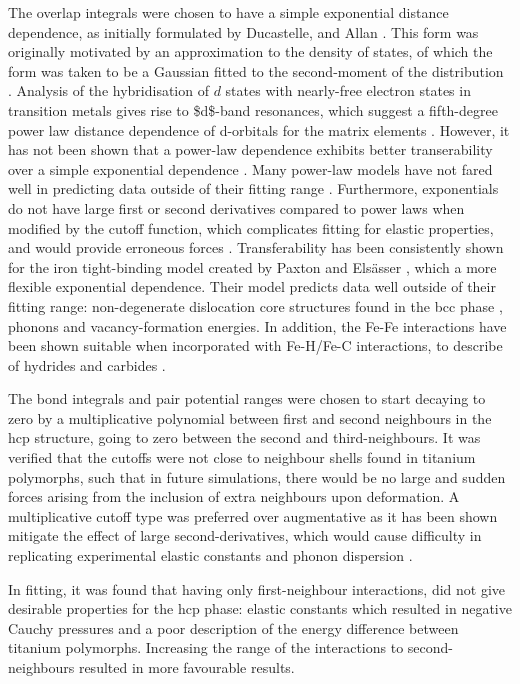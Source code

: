 \documentclass[a4paper,11pt]{article}
\numberwithin{equation}{chapter}
\numberwithin{listing}{chapter}
\begin{document}
The overlap integrals were chosen to have a simple exponential
distance dependence, as initially formulated by Ducastelle,
\cite{Ducastelle1970c} and Allan \cite{Allan1976}. This form was
originally motivated by an approximation to the density of states,
of which the form was taken to be a Gaussian fitted to the
second-moment of the distribution \cite{Spanjaard1984}. Analysis of
the hybridisation of \(d\) states with nearly-free electron states in
transition metals gives rise to \$d\$-band resonances, which suggest a
fifth-degree power law distance dependence of d-orbitals for the
matrix elements
\cite{Heine1967,Heine1980,Andersen1985,Harrison1989,Pettifor1995}. However, it has
not been shown that a power-law dependence exhibits better
transerability over a simple exponential dependence
\cite{Skinner1991,Paxton2010}. Many power-law models have not
fared well in predicting data outside of their fitting range
\cite{Paxton1987,Paxton1989,Girshick1998a,Trinkle2006,Ferrari2019a}. Furthermore,
exponentials do not have large first or second derivatives compared
to power laws when modified by the cutoff function, which
complicates fitting for elastic properties, and would provide
erroneous forces
\cite{Pashov2012}. Transferability has been consistently
shown for the iron tight-binding model created by Paxton and
Elsässer \cite{Paxton2010}, which a more flexible exponential
dependence. Their model predicts data well outside of their fitting
range: non-degenerate dislocation core structures found in the bcc
phase \cite{Simpsonb,Simpson2020}, phonons and vacancy-formation
energies. In addition, the Fe-Fe interactions have been shown
suitable when incorporated with Fe-H/Fe-C interactions, to describe
of hydrides and carbides \cite{Paxton2010,Paxton2013}.


The bond integrals and pair potential ranges were chosen to start
decaying to zero by a multiplicative polynomial between first and
second neighbours in the hcp structure, going to zero between the
second and third-neighbours. It was verified that the cutoffs were
not close to neighbour shells found in titanium
polymorphs, such that in future simulations, there would be no large
and sudden forces arising from the inclusion of extra neighbours
upon deformation. A multiplicative cutoff type was preferred over
augmentative as it has been shown mitigate the effect of large
second-derivatives, which would cause difficulty in replicating
experimental elastic constants and phonon dispersion
\cite{Pashov2012}.

In fitting, it was found that having only first-neighbour
interactions, did not give desirable properties for the hcp phase:
elastic constants which resulted in negative Cauchy pressures and a
poor description of the energy difference between titanium
polymorphs. Increasing the range of the interactions to
second-neighbours resulted in more favourable results.
\end{document}
